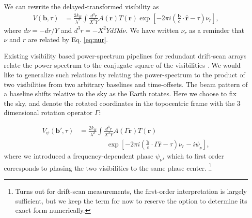 \documentclass[twocolumn,apj,numberedappendix]{emulateapj}
\renewcommand\[{\begin{equation}}
\renewcommand\]{\end{equation}}
\begin{document}
We can rewrite the delayed-transformed visibility as 
\small
\[
\begin{aligned}V(\boldsymbol{b},\tau) & =\frac{2k_{B}}{\lambda^{2}}\int\frac{d^{3}r}{X^{2}Y}A(\boldsymbol{r})T(\boldsymbol{r})\exp\left[-2\pi i\left(\frac{\boldsymbol{b}}{c}\cdot\hat{\boldsymbol{r}}-\tau\right)\nu_{r}\right],
\end{aligned}
\]
\normalsize
 where $d\nu=-dr/Y$ and $d^{3}r=-X^{2}Yd\Omega d\nu$. 
We have written $\nu_{r}$ as a reminder that $\nu$ and $r$ are related
by Eq. \eqref{eq:nur}. 

Existing visibility based power-spectrum pipelines for redundant drift-scan  arrays relate the power-spectrum to the conjugate square of the visibilities \citep{delay-transform, paper32, Ali2015}. We would like to generalize such relations by relating the power-spectrum to the product of two visibilities from two arbitrary baselines and time-offsets. 
The beam pattern of a baseline shifts relative to the sky as the Earth rotates. Here we choose to fix the sky, and denote the rotated coordinates
in the topocentric frame with the 3 dimensional rotation operator $\Gamma$:

\[
\begin{aligned}V_{\psi}(\boldsymbol{b'},\tau) & =\frac{2k_{B}}{\lambda^{2}}\int\frac{d^{3}r}{X^{2}Y}A(\Gamma\boldsymbol{r})T(\boldsymbol{r})\\
& \qquad \qquad  \exp\left[-2\pi i\left(\frac{\boldsymbol{b}}{c}\cdot\Gamma\hat{\boldsymbol{r}}-\tau\right)\nu_{r}-i\psi_\nu\right],\end{aligned}
\]
where we introduced a frequency-dependent phase $\psi_{\nu}$, which to first order corresponds to phasing the two visibilities to the same phase center. \footnote{Turns out for drift-scan measurements, the first-order interpretation is largely sufficient, but we keep the term for now to reserve the option to determine its exact form numerically.} 
\end{document}
